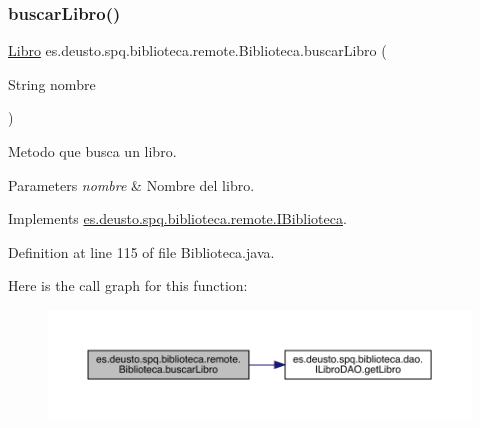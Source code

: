 \subsubsection{\texorpdfstring{buscar\+Libro()}{buscarLibro()}}
{\footnotesize\ttfamily \mbox{\hyperlink{classes_1_1deusto_1_1spq_1_1biblioteca_1_1data_1_1_libro}{Libro}} es.\+deusto.\+spq.\+biblioteca.\+remote.\+Biblioteca.\+buscar\+Libro (\begin{DoxyParamCaption}\item[{String}]{nombre }\end{DoxyParamCaption})}

Metodo que busca un libro. 
\begin{DoxyParams}{Parameters}
{\em nombre} & Nombre del libro. \\
\hline
\end{DoxyParams}


Implements \mbox{\hyperlink{interfacees_1_1deusto_1_1spq_1_1biblioteca_1_1remote_1_1_i_biblioteca_a29a3d22f9c3f8b84604eec2ab9955dfe}{es.\+deusto.\+spq.\+biblioteca.\+remote.\+I\+Biblioteca}}.



Definition at line 115 of file Biblioteca.\+java.

Here is the call graph for this function\+:
\nopagebreak
\begin{figure}[H]
\begin{center}
\leavevmode
\includegraphics[width=350pt]{classes_1_1deusto_1_1spq_1_1biblioteca_1_1remote_1_1_biblioteca_a5d8bbdd7819a301e1a7bfee2795b9040_cgraph}
\end{center}
\end{figure}
\mbox{\label{classes_1_1deusto_1_1spq_1_1biblioteca_1_1remote_1_1_biblioteca_a43429c3eea8c1a6a49b6994439606ee3}} 

